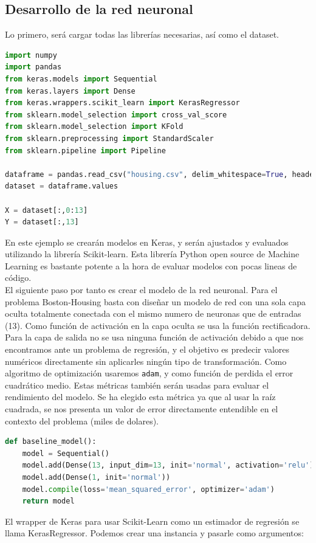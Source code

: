 \subsection{Desarrollo de la red neuronal}
Lo primero, será cargar todas las librerías necesarias, así como el dataset.
\begin{lstlisting}[language=Python]
import numpy
import pandas
from keras.models import Sequential
from keras.layers import Dense
from keras.wrappers.scikit_learn import KerasRegressor
from sklearn.model_selection import cross_val_score
from sklearn.model_selection import KFold
from sklearn.preprocessing import StandardScaler
from sklearn.pipeline import Pipeline

dataframe = pandas.read_csv("housing.csv", delim_whitespace=True, header=None)
dataset = dataframe.values

X = dataset[:,0:13]
Y = dataset[:,13]
\end{lstlisting}
En este ejemplo se crearán modelos en Keras, y serán ajustados y evaluados utilizando la librería Scikit-learn. Esta librería Python open source de Machine Learning es bastante potente a la hora de evaluar modelos con pocas lineas de código.\\
El siguiente paso por tanto es crear el modelo de la red neuronal. Para el problema Boston-Housing basta con diseñar un modelo de red con una sola capa oculta totalmente conectada con el mismo numero de neuronas que de entradas (13). Como función de activación en la capa oculta se usa la función rectificadora. Para la capa de salida no se usa ninguna función de activación debido a que nos encontramos ante un problema de regresión, y el objetivo es predecir valores numéricos directamente sin aplicarles ningún tipo de transformación. Como algoritmo de optimización usaremos \lstinline{adam}, y como función de perdida el error cuadrático medio. Estas métricas también serán usadas para evaluar el rendimiento del modelo. Se ha elegido esta métrica ya que al usar la raíz cuadrada, se nos presenta un valor de error directamente entendible en el contexto del problema (miles de dolares).
\begin{lstlisting}[language=Python]
def baseline_model():
	model = Sequential()
	model.add(Dense(13, input_dim=13, init='normal', activation='relu'))
	model.add(Dense(1, init='normal'))
	model.compile(loss='mean_squared_error', optimizer='adam')
	return model
\end{lstlisting}
El wrapper de Keras para usar Scikit-Learn como un estimador de regresión se llama KerasRegressor. Podemos crear una instancia y pasarle como argumentos:
